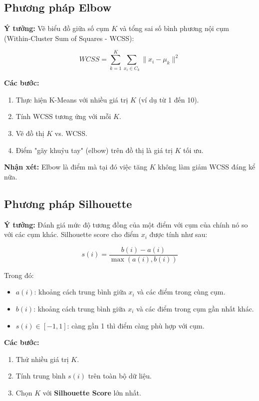 \documentclass[12pt]{article}
\begin{document}
	\subsection{Phương pháp Elbow}
	
	\textbf{Ý tưởng:} Vẽ biểu đồ giữa số cụm $K$ và tổng sai số bình phương nội cụm (Within-Cluster Sum of Squares - WCSS):
	
	\[
	WCSS = \sum_{k=1}^{K} \sum_{x_i \in C_k} \|x_i - \mu_k\|^2
	\]
	
	\textbf{Các bước:}
	
	\begin{enumerate}
	\item Thực hiện K-Means với nhiều giá trị $K$ (ví dụ từ 1 đến 10).
	\item Tính WCSS tương ứng với mỗi $K$.
	\item Vẽ đồ thị $K$ vs. WCSS.
	\item Điểm "gãy khuỷu tay" (elbow) trên đồ thị là giá trị $K$ tối ưu.
	\end{enumerate}
	
	\textbf{Nhận xét:} Elbow là điểm mà tại đó việc tăng $K$ không làm giảm WCSS đáng kể nữa.
	
	\subsection{Phương pháp Silhouette}
	
	\textbf{Ý tưởng:} Đánh giá mức độ tương đồng của một điểm với cụm của chính nó so với các cụm khác. Silhouette score cho điểm $x_i$ được tính như sau:
	
	\[
	s(i) = \frac{b(i) - a(i)}{\max \left( a(i), b(i) \right)}
	\]
	
	Trong đó:
	\begin{itemize}
	\item $a(i)$: khoảng cách trung bình giữa $x_i$ và các điểm trong cùng cụm.
	\item $b(i)$: khoảng cách trung bình giữa $x_i$ và các điểm trong cụm gần nhất khác.
	\item $s(i) \in [-1, 1]$: càng gần 1 thì điểm càng phù hợp với cụm.
	\end{itemize}
	
	\textbf{Các bước:}
	
	\begin{enumerate}
	\item Thử nhiều giá trị $K$.
	\item Tính trung bình $s(i)$ trên toàn bộ dữ liệu.
	\item Chọn $K$ với \textbf{Silhouette Score} lớn nhất.
	\end{enumerate}
	
\end{document}
